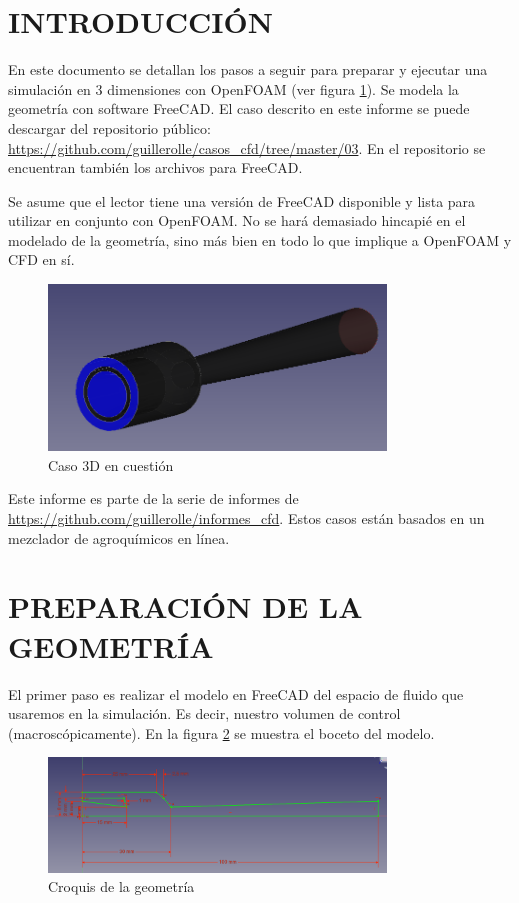\documentclass[oneside,a4paper,spanish,links]{amca}
\begin{document}
\section{INTRODUCCIÓN}
En este documento se detallan los pasos a seguir para preparar y ejecutar una simulación en 3 dimensiones con OpenFOAM (ver figura \ref{fg:intro}). Se modela la geometría con software FreeCAD. El caso descrito en este informe se puede descargar del repositorio público: \url{https://github.com/guillerolle/casos_cfd/tree/master/03}. En el repositorio se encuentran también los archivos para FreeCAD.

Se asume que el lector tiene una versión de FreeCAD disponible y lista para utilizar en conjunto con OpenFOAM. No se hará demasiado hincapié en el modelado de la geometría, sino más bien en todo lo que implique a OpenFOAM y CFD en sí.

\begin{figure}[htb]
	\centerline{\includegraphics[width=0.8\textwidth]{Figuras/01_INTRO.png}} \caption{Caso 3D en cuestión} \label{fg:intro}
\end{figure}

Este informe es parte de la serie de informes de \url{https://github.com/guillerolle/informes_cfd}. Estos casos están basados en un mezclador de agroquímicos en línea.

\section{PREPARACIÓN DE LA GEOMETRÍA}
El primer paso es realizar el modelo en FreeCAD del espacio de fluido que usaremos en la simulación. Es decir, nuestro volumen de control (macroscópicamente). En la figura \ref{fg:boceto_revo} se muestra el boceto del modelo. 

\begin{figure}[htb]
	\centerline{\includegraphics[width=0.8\textwidth]{Figuras/02_BOCETO_REVOLUCION.png}} \caption{Croquis de la geometría} \label{fg:boceto_revo}
\end{figure}
\end{document}
